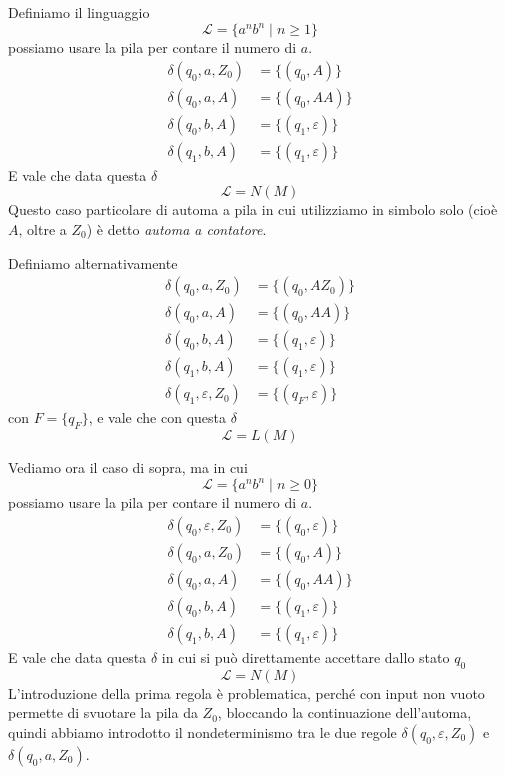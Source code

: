 \documentclass[12pt]{report}
\theoremstyle{definition}
\theoremstyle{regard}
\begin{document}
\begin{tcolorbox}
	Definiamo il linguaggio
	$$ \mathcal{L} = \{ a^n b^n \mid n \geq 1 \} $$
	possiamo usare la pila per contare il numero di $a$.
	\begin{align*}
		\delta(q_0, a, Z_0) &= \{(q_0, A)\} \\
		\delta(q_0, a, A)   &= \{(q_0, AA) \} \\
		\delta(q_0, b, A)   &= \{ (q_1, \varepsilon) \} \\
		\delta(q_1, b, A)   &= \{ (q_1, \varepsilon) \} 
	\end{align*}
	E vale che data questa $\delta$
	$$ \mathcal{L} = N(M) $$
	Questo caso particolare di automa a pila in cui utilizziamo in simbolo solo (cioè $A$, oltre a $Z_0$) è detto \textit{automa a contatore}.

	Definiamo alternativamente
	\begin{align*}
		\delta(q_0, a, Z_0) &= \{(q_0, AZ_0)\} \\
		\delta(q_0, a, A)   &= \{(q_0, AA)\} \\
		\delta(q_0, b, A)   &= \{(q_1, \varepsilon)\} \\
		\delta(q_1, b, A)   &= \{(q_1, \varepsilon)\} \\
		\delta(q_1, \varepsilon, Z_0) &= \{(q_F, \varepsilon)\}
	\end{align*}
	con $F = \{q_F\}$, e vale che con questa $\delta$
	$$ \mathcal{L} = L(M) $$

	Vediamo ora il caso di sopra, ma in cui
	$$ \mathcal{L} = \{ a^n b^n \mid n \geq 0 \} $$
	possiamo usare la pila per contare il numero di $a$.
	\begin{align*}
		\delta(q_0, \varepsilon, Z_0) &= \{(q_0, \varepsilon)\} \\
		\delta(q_0, a, Z_0) &= \{(q_0, A)\} \\
		\delta(q_0, a, A)   &= \{(q_0, AA) \} \\
		\delta(q_0, b, A)   &= \{ (q_1, \varepsilon) \} \\
		\delta(q_1, b, A)   &= \{ (q_1, \varepsilon) \} 
	\end{align*}
	E vale che data questa $\delta$ in cui si può direttamente accettare dallo stato $q_0$
	$$ \mathcal{L} = N(M) $$
	L'introduzione della prima regola è problematica, perché con input non vuoto permette di svuotare la pila da $Z_0$, bloccando la continuazione dell'automa, quindi abbiamo introdotto il nondeterminismo tra le due regole $\delta(q_0, \varepsilon, Z_0)$ e $\delta(q_0, a, Z_0)$.


\end{tcolorbox}
\end{document}

